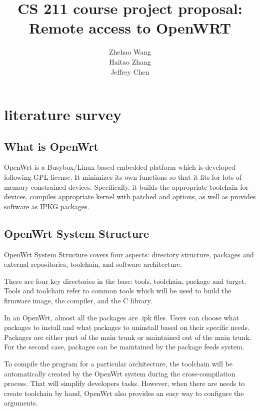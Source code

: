 \documentclass{sig-alternate-05-2015}
\begin{document}
\title{CS 211 course project proposal: \\Remote access to OpenWRT}


\author{
\alignauthor
Zhehao Wang \\
\alignauthor
Haitao Zhang \\
\alignauthor 
Jeffrey Chen
}

\maketitle
\section{literature survey}

\subsection{What is OpenWrt}
OpenWrt \cite{fainelli2008openwrt, kim2014implementation} is a Busybox/Linux based embedded platform which is developed following GPL license. It minimizes its own functions so that it fits for lots of memory constrained devices. Specifically, it builds the appropriate toolchain for devices, compiles appropriate kernel with patched and options, as well as provides software as IPKG packages.

\subsection{OpenWrt System Structure}
OpenWrt System Structure covers four aspects: directory structure, packages and external repositories, toolchain, and software architecture.

There are four key directories in the base: tools, toolchain, package and target.
Tools and toolchain refer to common tools which will be used to build the firmware image, the compiler, and the C library.

In an OpenWrt, almost all the packages are .ipk files. Users can choose what packages to install and what packages to uninstall based on their specific needs. Packages are either part of the main trunk or maintained out of the main trunk. For the second case, packages can be maintained by the package feeds system.

To compile the program for a particular architecture, the toolchain will be automatically created by the OpenWrt system during the cross-compilation process. That will simplify developers tasks. However, when there are needs to create toolchain by hand, OpenWrt also provides an easy way to configure the arguments.
\end{document}
